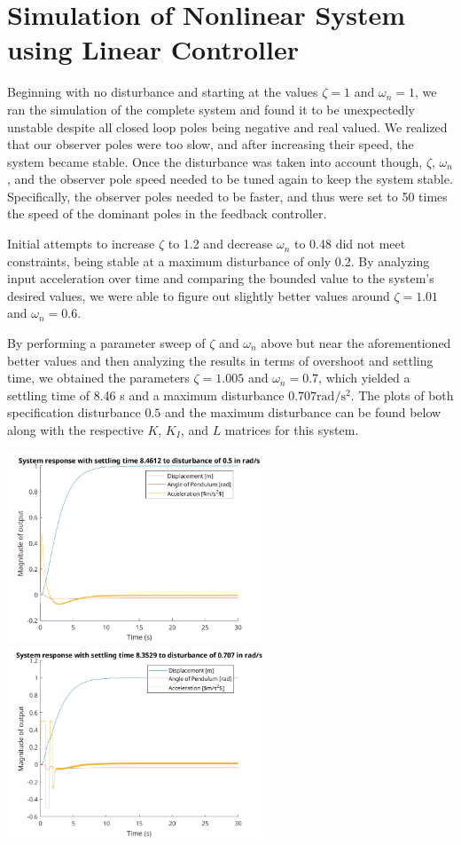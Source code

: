\documentclass[12pt]{article}
\begin{document}
\section{Simulation of Nonlinear System using Linear Controller}

Beginning with no disturbance and starting at the values $\zeta = 1$ and $\omega_n = 1$, we ran the simulation of the complete system and found it to be unexpectedly unstable despite all closed loop poles being negative and real valued. We realized that our observer poles were too slow, and after increasing their speed, the system became stable. Once the disturbance was taken into account though, $\zeta$, $\omega_n$, and the observer pole speed needed to be tuned again to keep the system stable. Specifically, the observer poles needed to be faster, and thus were set to 50 times the speed of the dominant poles in the feedback controller.

Initial attempts to increase $\zeta$ to 1.2 and decrease $\omega_n$ to 0.48 did not meet constraints, being stable at a maximum disturbance of only 0.2. By analyzing input acceleration over time and comparing the bounded value to the system's desired values, we were able to figure out slightly better values around $\zeta = 1.01$ and $\omega_n = 0.6$.

By performing a parameter sweep of $\zeta$ and $\omega_n$ above but near the aforementioned better values and then analyzing the results in terms of overshoot and settling time, we obtained the parameters $\zeta = 1.005$ and $\omega_n = 0.7$, which yielded a settling time of 8.46 s and a maximum disturbance $0.707 \text{rad}/\text{s}^{2}$. The plots of both specification disturbance $0.5$ and the maximum disturbance can be found below along with the respective $K$, $K_I$, and $L$ matrices for this system.

\begin{center}
    \includegraphics[width=3in]{graphs/sim_displacement_0.5.png}
    \includegraphics[width=3in]{graphs/sim_displacement_0.707.png}
\end{center}
\end{document}
